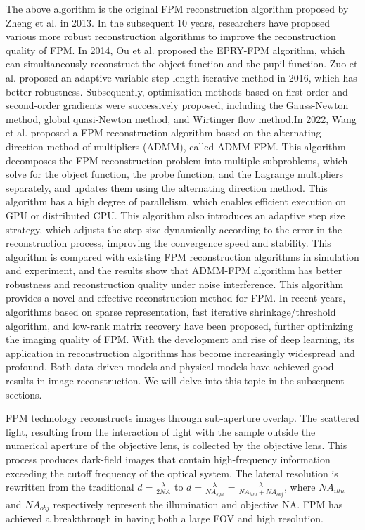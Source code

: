 \documentclass[journal,review,submit,pdftex,moreauthors]{Definitions/mdpi}
\begin{document}
The above algorithm is the original FPM reconstruction algorithm proposed by Zheng et al. in 2013. In the subsequent 10 years, researchers have proposed various more robust reconstruction algorithms to improve the reconstruction quality of FPM. In 2014, Ou et al. proposed the EPRY-FPM\cite{ou2014embedded} algorithm, which can simultaneously reconstruct the object function and the pupil function. Zuo et al. proposed an adaptive variable step-length iterative method\cite{zuo2016adaptive} in 2016, which has better robustness. Subsequently, optimization methods based on first-order and second-order gradients were successively proposed, including the Gauss-Newton method\cite{tian2014multiplexed}, global quasi-Newton method\cite{yeh2015experimental}, and Wirtinger flow method\cite{bian2015fourier}.In 2022, Wang et al. proposed a FPM reconstruction algorithm based on the alternating direction method of multipliers (ADMM), called ADMM-FPM\cite{wang2022fourier}. This algorithm decomposes the FPM reconstruction problem into multiple subproblems, which solve for the object function, the probe function, and the Lagrange multipliers separately, and updates them using the alternating direction method. This algorithm has a high degree of parallelism, which enables efficient execution on GPU or distributed CPU. This algorithm also introduces an adaptive step size strategy, which adjusts the step size dynamically according to the error in the reconstruction process, improving the convergence speed and stability. This algorithm is compared with existing FPM reconstruction algorithms in simulation and experiment, and the results show that ADMM-FPM algorithm has better robustness and reconstruction quality under noise interference. This algorithm provides a novel and effective reconstruction method for FPM.
In recent years, algorithms based on sparse representation\cite{zhang2017fourier}, fast iterative shrinkage/threshold algorithm\cite{sun2019regularized}, and low-rank matrix recovery\cite{jagatap2019sample} have been proposed, further optimizing the imaging quality of FPM. With the development and rise of deep learning, its application in reconstruction algorithms has become increasingly widespread and profound. Both data-driven models and physical models have achieved good results in image reconstruction. We will delve into this topic in the subsequent sections.

FPM technology reconstructs images through sub-aperture overlap. The scattered light, resulting from the interaction of light with the sample outside the numerical aperture of the objective lens, is collected by the objective lens. This process produces dark-field images that contain high-frequency information exceeding the cutoff frequency of the optical system. The lateral resolution is rewritten from the traditional $d=\frac{\lambda}{2NA}$ to $d=\frac{\lambda}{NA_{syn}}=\frac{\lambda}{NA_{illu}+NA_{obj}}$, where $NA_{illu}$ and $NA_{obj}$ respectively represent the illumination and objective NA. FPM has achieved a breakthrough in having both a large FOV and high resolution. 
\end{document}
